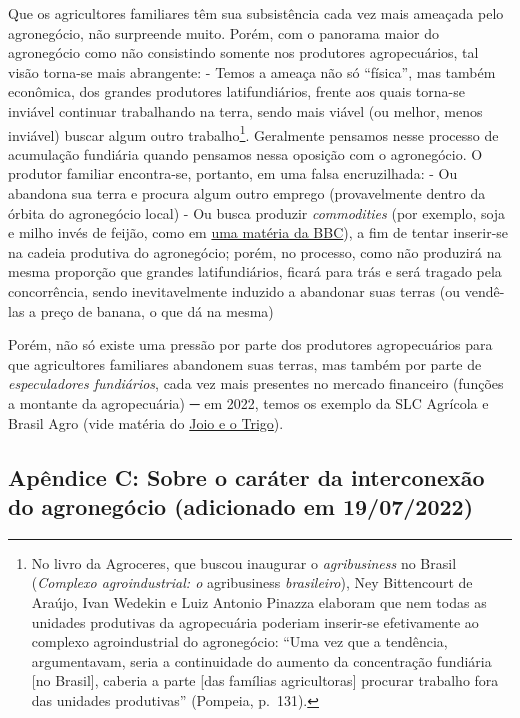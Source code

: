 \documentclass[12pt]{article}
\numberwithin{equation}{section}
\theoremstyle{plain}
\theoremstyle{definition}
\theoremstyle{remark}
\begin{document}
Que os agricultores familiares têm sua subsistência cada vez mais ameaçada pelo agronegócio, não surpreende muito. Porém, com o panorama maior do agronegócio como não consistindo somente nos produtores agropecuários, tal visão torna-se mais abrangente: - Temos a ameaça não só ``física'', mas também econômica, dos grandes produtores latifundiários, frente aos quais torna-se inviável continuar trabalhando na terra, sendo mais viável (ou melhor, menos inviável) buscar algum outro trabalho\footnote{No livro da Agroceres, que buscou inaugurar o \textit{agribusiness} no Brasil (\textit{Complexo agroindustrial: o} agribusiness \textit{brasileiro}), Ney Bittencourt de Araújo, Ivan Wedekin e Luiz Antonio Pinazza elaboram que nem todas as unidades produtivas da agropecuária poderiam inserir-se efetivamente ao complexo agroindustrial do agronegócio: ``Uma vez que a tendência, argumentavam, seria a continuidade do aumento da concentração fundiária {[}no Brasil{]}, caberia a parte {[}das famílias agricultoras{]} procurar trabalho fora das unidades produtivas'' (Pompeia, p.~131).}. Geralmente pensamos nesse processo de acumulação fundiária quando pensamos nessa oposição com o agronegócio. O produtor familiar encontra-se, portanto, em uma falsa encruzilhada: - Ou abandona sua terra e procura algum outro emprego (provavelmente dentro da órbita do agronegócio local) - Ou busca produzir \textit{commodities} (por exemplo, soja e milho invés de feijão, como em \href{https://www.bbc.com/portuguese/brasil-59070059}{uma matéria da BBC}), a fim de tentar inserir-se na cadeia produtiva do agronegócio; porém, no processo, como não produzirá na mesma proporção que grandes latifundiários, ficará para trás e será tragado pela concorrência, sendo inevitavelmente induzido a abandonar suas terras (ou vendê-las a preço de banana, o que dá na mesma)

Porém, não só existe uma pressão por parte dos produtores agropecuários para que agricultores familiares abandonem suas terras, mas também por parte de \textit{especuladores fundiários}, cada vez mais presentes no mercado financeiro (funções a montante da agropecuária) ─ em 2022, temos os exemplo da SLC Agrícola e Brasil Agro (vide matéria do \href{https://ojoioeotrigo.com.br/2021/11/mercado-financeiro-e-agronegocio/}{Joio e o Trigo}).

\hypertarget{apuxeandice-c-sobre-o-caruxe1ter-da-interconexuxe3o-do-agroneguxf3cio-adicionado-em-19072022}{%
\subsection{Apêndice C: Sobre o caráter da interconexão do agronegócio (adicionado em 19/07/2022)}\label{apuxeandice-c-sobre-o-caruxe1ter-da-interconexuxe3o-do-agroneguxf3cio-adicionado-em-19072022}}
\end{document}
